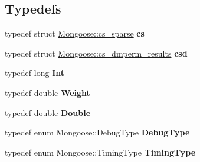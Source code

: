\subsection*{Typedefs}
\begin{DoxyCompactItemize}
\item 
\hypertarget{namespace_mongoose_a1b8d282946ae505da1ce3002ac974876}{}\label{namespace_mongoose_a1b8d282946ae505da1ce3002ac974876} 
typedef struct \hyperlink{struct_mongoose_1_1cs__sparse}{Mongoose\+::cs\+\_\+sparse} {\bfseries cs}
\item 
\hypertarget{namespace_mongoose_af36de6b101bac4a587e3b3651af89308}{}\label{namespace_mongoose_af36de6b101bac4a587e3b3651af89308} 
typedef struct \hyperlink{struct_mongoose_1_1cs__dmperm__results}{Mongoose\+::cs\+\_\+dmperm\+\_\+results} {\bfseries csd}
\item 
\hypertarget{namespace_mongoose_afa81a5f4071f80c779794b10703cd6c4}{}\label{namespace_mongoose_afa81a5f4071f80c779794b10703cd6c4} 
typedef long {\bfseries Int}
\item 
\hypertarget{namespace_mongoose_af7f337a1111b7e1b3c8375fd1649e675}{}\label{namespace_mongoose_af7f337a1111b7e1b3c8375fd1649e675} 
typedef double {\bfseries Weight}
\item 
\hypertarget{namespace_mongoose_a1612ef2565308c2f3e7c794e06c91098}{}\label{namespace_mongoose_a1612ef2565308c2f3e7c794e06c91098} 
typedef double {\bfseries Double}
\item 
\hypertarget{namespace_mongoose_a8c083356efe5952fed500d6ac126125e}{}\label{namespace_mongoose_a8c083356efe5952fed500d6ac126125e} 
typedef enum Mongoose\+::\+Debug\+Type {\bfseries Debug\+Type}
\item 
\hypertarget{namespace_mongoose_aa34013708f826931df6989b8af96c938}{}\label{namespace_mongoose_aa34013708f826931df6989b8af96c938} 
typedef enum Mongoose\+::\+Timing\+Type {\bfseries Timing\+Type}
\end{DoxyCompactItemize}
